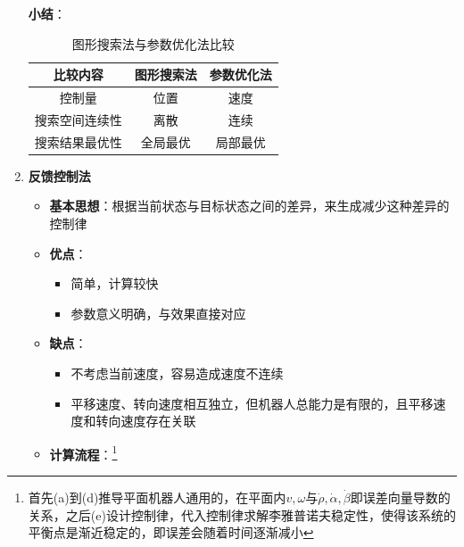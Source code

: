 \documentclass[../main.tex]{subfiles}
\begin{document}
\begin{enumerate}
\begin{itemize}
                        \end{itemize}
                    \textbf{小结}：
                    \begin{table}[htbp]
                        \centering
                        \caption{图形搜索法与参数优化法比较}
                        \begin{tabular}{ccc}
                        \toprule
                        \textbf{比较内容} & \textbf{图形搜索法} & \textbf{参数优化法} \\
                        \midrule
                        控制量 & 位置 & 速度 \\
                        搜索空间连续性 & 离散 & 连续 \\
                        搜索结果最优性 & 全局最优 & 局部最优 \\
                        \bottomrule
                        \end{tabular}
                    \end{table}
                    \item \textbf{反馈控制法}
                        \begin{itemize}
                            \item \textbf{基本思想}：根据当前状态与目标状态之间的差异，来生成减少这种差异的控制律
                            \item \textbf{优点}：
                                \begin{itemize}
                                    \item 简单，计算较快
                                    \item 参数意义明确，与效果直接对应
                                \end{itemize}
                            \item \textbf{缺点}：
                                \begin{itemize}
                                    \item 不考虑当前速度，容易造成速度不连续
                                    \item 平移速度、转向速度相互独立，但机器人总能力是有限的，且平移速度和转向速度存在关联
                                \end{itemize}
                            \item \textbf{计算流程}：\footnote{首先(a)到(d)推导平面机器人通用的，在平面内$v,\omega$与$\dot{\rho},\dot{\alpha},\dot{\beta}$即误差向量导数的关系，之后(e)设计控制律，代入控制律求解李雅普诺夫稳定性，使得该系统的平衡点是渐近稳定的，即误差会随着时间逐渐减小}

\end{itemize}
\end{enumerate}
\end{document}
